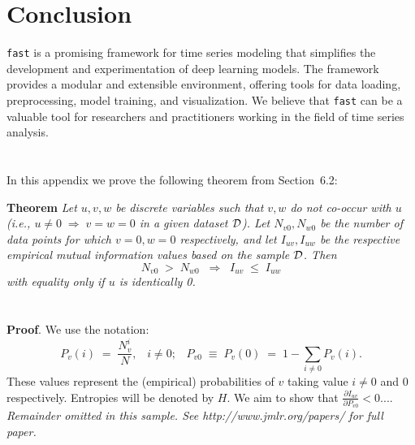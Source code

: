 \documentclass[twoside,11pt]{article}
\newcommand{\dataset}{{\cal D}}
\newcommand{\fracpartial}[2]{\frac{\partial #1}{\partial  #2}}
\begin{document}
\section{Conclusion}

\texttt{fast} is a promising framework for time series modeling that simplifies the development and experimentation of deep learning models. The framework provides a modular and extensible environment, offering tools for data loading, preprocessing, model training, and visualization. We believe that \texttt{fast} can be a valuable tool for researchers and practitioners working in the field of time series analysis.




\newpage

\appendix
\section{}
\label{app:theorem}



In this appendix we prove the following theorem from
Section~6.2:

\noindent
{\bf Theorem} {\it Let $u,v,w$ be discrete variables such that $v, w$ do
not co-occur with $u$ (i.e., $u\neq0\;\Rightarrow \;v=w=0$ in a given
dataset $\dataset$). Let $N_{v0},N_{w0}$ be the number of data points for
which $v=0, w=0$ respectively, and let $I_{uv},I_{uw}$ be the
respective empirical mutual information values based on the sample
$\dataset$. Then
\[
	N_{v0} \;>\; N_{w0}\;\;\Rightarrow\;\;I_{uv} \;\leq\;I_{uw}
\]
with equality only if $u$ is identically 0.} \hfill\BlackBox

\section{}

\noindent
{\bf Proof}. We use the notation:
\[
P_v(i) \;=\;\frac{N_v^i}{N},\;\;\;i \neq 0;\;\;\;
P_{v0}\;\equiv\;P_v(0)\; = \;1 - \sum_{i\neq 0}P_v(i).
\]
These values represent the (empirical) probabilities of $v$
taking value $i\neq 0$ and 0 respectively.  Entropies will be denoted
by $H$. We aim to show that $\fracpartial{I_{uv}}{P_{v0}} < 0$....\\

{\noindent \em Remainder omitted in this sample. See http://www.jmlr.org/papers/ for full paper.}


\vskip 0.2in

\end{document}
